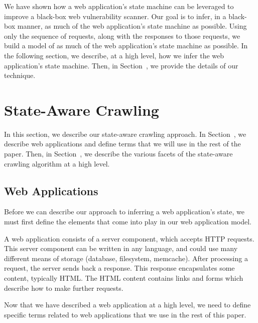 We have shown how a web application's state machine can be leveraged to improve
a black-box web vulnerability scanner. Our goal is to infer, in a black-box
manner, as much of the web application's state machine as possible. Using only
the sequence of requests, along with the responses to those requests, we build
a model of as much of the web application's state machine as possible. In the
following section, we describe, at a high level, how we infer the web
application's state machine. Then, in Section~, we provide the
details of our technique.

\section{State-Aware Crawling}

In this section, we describe our state-aware crawling approach. In
Section~, we describe web applications and define terms that we
will use in the rest of the paper. Then, in Section~, we
describe the various facets of the state-aware crawling algorithm at a high
level.

\subsection{Web Applications}

Before we can describe our approach to inferring a web application's state, we
must first define the elements that come into play in our web application model.

A web application consists of a server component, which accepts HTTP requests.
This server component can be written in any language, and could use many
different means of storage (database, filesystem, memcache). After
processing a request, the server sends back a response. This response
encapsulates some content, typically HTML. The HTML content contains links and
forms which describe how to make further requests. 

Now that we have described a web application at a high level, we need to define
specific terms related to web applications that we use in the rest of this paper.

